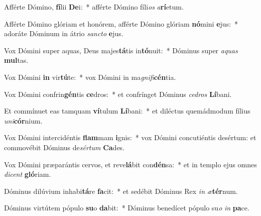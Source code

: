 \item Afférte Dómino, \textbf{fí}lii \textbf{De}i:~* afférte Dómino fíli\textit{os} \textit{a}\textbf{rí}etum.
\item Afférte Dómino glóriam et honórem, afférte Dómino glóriam \textbf{nó}mini \textbf{e}jus:~* adoráte Dóminum in átrio \textit{sanc}\textit{to} \textbf{e}jus.
\item Vox Dómini super aquas, Deus majes\textbf{tá}tis in\textbf{tó}nuit:~* Dóminus super \textit{a}\textit{quas} \textbf{mul}tas.
\item Vox Dómini \textbf{in} vir\textbf{tú}te:~* vox Dómini in ma\textit{gni}\textit{fi}\textbf{cén}tia.
\item Vox Dómini confrin\textbf{gén}tis \textbf{ce}dros:~* et confrínget Dóminus \textit{ce}\textit{dros} \textbf{Lí}bani.
\item Et commínuet eas tamquam \textbf{ví}tulum \textbf{Lí}bani:~* et diléctus quemádmodum fílius \textit{u}\textit{ni}\textbf{cór}nium.
\item Vox Dómini intercidéntis \textbf{flam}mam \textbf{i}gnis:~* vox Dómini concutiéntis desértum: et commovébit Dóminus de\textit{sér}\textit{tum} \textbf{Ca}des.
\item Vox Dómini præparántis cervos, et reve\textbf{lá}bit con\textbf{dén}sa:~* et in templo ejus omnes \textit{di}\textit{cent} \textbf{gló}riam.
\item Dóminus dilúvium inhabi\textbf{tá}re \textbf{fa}cit:~* et sedébit Dóminus Rex \textit{in} \textit{æ}\textbf{tér}num.
\item Dóminus virtútem pópulo \textbf{su}o \textbf{da}bit:~* Dóminus benedícet pópulo su\textit{o} \textit{in} \textbf{pa}ce.
